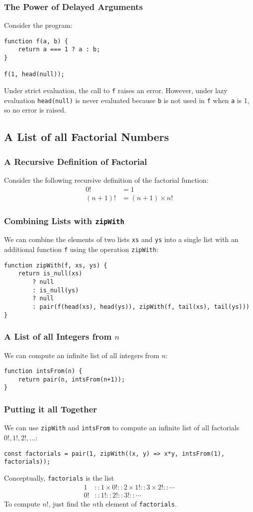 \documentclass[12pt]{beamer}
\begin{document}
\begin{frame}[fragile]
\frametitle{The Power of Delayed Arguments}
Consider the program:
\begin{lstlisting}
function f(a, b) {
	return a === 1 ? a : b;
}

f(1, head(null));
\end{lstlisting}\pause
Under strict evaluation, the call to \texttt{f} raises an error. However, under lazy evaluation \texttt{head(null)} is never evaluated because \texttt{b} is not used in \texttt{f} when \texttt{a} is 1, so no error is raised.
\end{frame}

\subsection{A List of all Factorial Numbers}

\begin{frame}
\frametitle{A Recursive Definition of Factorial}
Consider the following recursive definition of the factorial function:
\begin{align*}
0! &= 1 \\
(n+1)! &= (n+1)\times n!
\end{align*}
\end{frame}

\begin{frame}[fragile]
\frametitle{Combining Lists with \texttt{zipWith}}
We can combine the elements of two lists \texttt{xs} and \texttt{ys} into a single list with an additional function \texttt{f} using the operation \texttt{zipWith}:
\begin{lstlisting}
function zipWith(f, xs, ys) {
	return is_null(xs)
		? null
		: is_null(ys)
		? null
		: pair(f(head(xs), head(ys)), zipWith(f, tail(xs), tail(ys)))
}
\end{lstlisting}
\end{frame}

\begin{frame}[fragile]
\frametitle{A List of all Integers from $n$}
We can compute an infinite list of all integers from $n$:
\begin{lstlisting}
function intsFrom(n) {
	return pair(n, intsFrom(n+1));
}
\end{lstlisting}
\end{frame}

\begin{frame}[fragile]
\frametitle{Putting it all Together}
We can use \texttt{zipWith} and \texttt{intsFrom} to compute an infinite list of all factorials $0!, 1!, 2!,\ldots$:
\begin{lstlisting}
const factorials = pair(1, zipWith((x, y) => x*y, intsFrom(1), factorials));
\end{lstlisting}\pause
Conceptually, \texttt{factorials} is the list
\begin{align*}
1 &:: 1 \times 0! :: 2 \times 1! :: 3 \times 2! :: \cdots \\
0! &:: 1! :: 2! :: 3! :: \cdots
\end{align*}
To compute $n!$, just find the $n$th element of \texttt{factorials}.
\end{frame}
\end{document}
